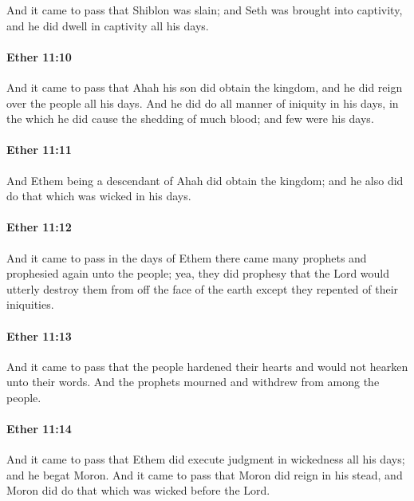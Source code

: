 			And it came to pass that Shiblon was slain;
			and Seth was brought into captivity,
			and he did dwell in captivity all his days.

		\paragraph{Ether 11:10} %
			\label{ETHER-11-10}

			And it came to pass that Ahah his son did obtain the kingdom,
			and he did reign over the people all his days.
			And he did do all manner of iniquity in his days,
			in the which he did cause the shedding of much blood;
			and few were his days.

		\paragraph{Ether 11:11} %
			\label{ETHER-11-11}

			And Ethem being a descendant of Ahah did obtain the kingdom;
			and he also did do that which was wicked in his days.

		\paragraph{Ether 11:12} %
			\label{ETHER-11-12}

			And it came to pass in the days of Ethem
			there came many prophets and prophesied again unto the people;
			yea, they did prophesy that the Lord would utterly destroy them
			from off the face of the earth
			except they repented of their iniquities.

		\paragraph{Ether 11:13} %
			\label{ETHER-11-13}

			And it came to pass that the people hardened their hearts
			and would not hearken unto their words.
			And the prophets mourned and withdrew from among the people.

		\paragraph{Ether 11:14} %
			\label{ETHER-11-14}

			And it came to pass that
			Ethem did execute judgment in wickedness all his days;
			and he begat Moron.
			And it came to pass that Moron did reign in his stead,
			and Moron did do that which was wicked before the Lord.

